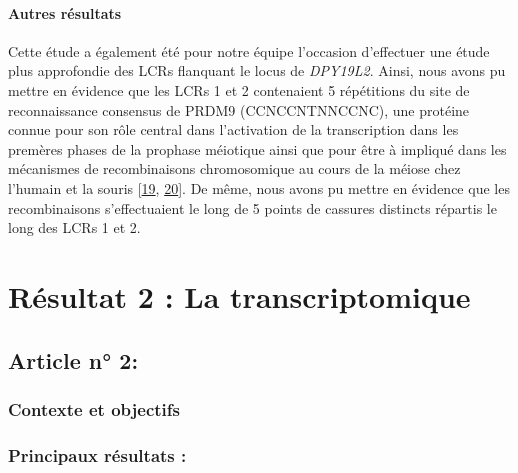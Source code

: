\documentclass[12pt,twoside]{reedthesis}
\theoremstyle{definition}
\theoremstyle{definition}
\theoremstyle{remark}
\begin{document}
  \paragraph{Autres résultats}\label{autres-resultats}
  
  Cette étude a également été pour notre équipe l'occasion d'effectuer une
  étude plus approfondie des LCRs flanquant le locus de \emph{DPY19L2}.
  Ainsi, nous avons pu mettre en évidence que les LCRs 1 et 2 contenaient
  5 répétitions du site de reconnaissance consensus de PRDM9
  (CCNCCNTNNCCNC), une protéine connue pour son rôle central dans
  l'activation de la transcription dans les premères phases de la prophase
  méiotique ainsi que pour être à impliqué dans les mécanismes de
  recombinaisons chromosomique au cours de la méiose chez l'humain et la
  souris {[}\protect\hyperlink{ref-Parvanov2010}{19},
  \protect\hyperlink{ref-Baudat2010}{20}{]}. De même, nous avons pu mettre
  en évidence que les recombinaisons s'effectuaient le long de 5 points de
  cassures distincts répartis le long des LCRs 1 et 2.
  
  \newpage
  
  \hypertarget{transcriptome}{\section{Résultat 2 : La
  transcriptomique}\label{transcriptome}}
  
  \subsection{Article n° 2:}\label{article-n-2}
  
  \newpage
  
  \subsubsection{Contexte et objectifs}\label{contexte-et-objectifs-1}
  
  \newpage
  
  
  
  \newpage
  
  \subsubsection{Principaux résultats :}\label{principaux-resultats-1}
  
\end{document}
